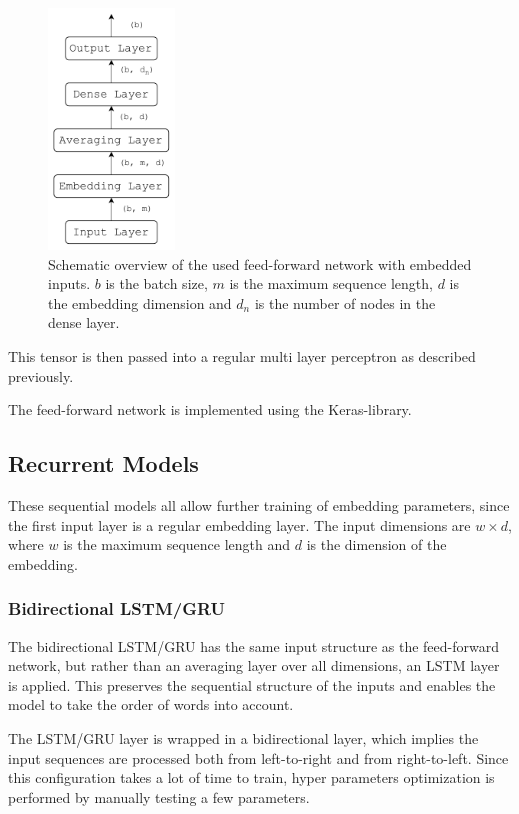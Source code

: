 \begin{figure}[ht]
    \centering
    \includegraphics[width=0.3\textwidth]{Figures/figs-ff_emb.pdf}
    \caption{Schematic overview of the used feed-forward network with embedded inputs. $b$ is the batch size, $m$ is the maximum sequence length, $d$ is the embedding dimension and $d_n$ is the number of nodes in the dense layer.}
\label{fig:emb_ff}
\end{figure}

This tensor is then passed into a regular multi layer perceptron as described previously.

The feed-forward network is implemented using the Keras-library. 

\subsection{Recurrent Models}

These sequential models all allow further training of embedding parameters, since the first input layer is a regular embedding layer. The input dimensions are $w \times d$, where $w$ is the maximum sequence length and $d$ is the dimension of the embedding. 

\subsubsection{Bidirectional LSTM/GRU}

The bidirectional LSTM/GRU has the same input structure as the feed-forward network, but rather than an averaging layer over all dimensions, an LSTM layer is applied. This preserves the sequential structure of the inputs and enables the model to take the order of words into account. 

The LSTM/GRU layer is wrapped in a bidirectional layer, which implies the input sequences are processed both from left-to-right and from right-to-left. Since this configuration takes a lot of time to train, hyper parameters optimization is performed by manually testing a few parameters.  

